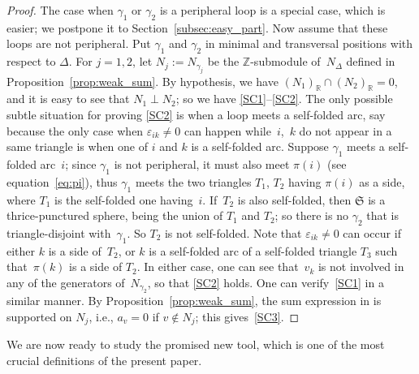 \documentclass[10pt,a4paper]{amsart}
\numberwithin{equation}{section}
\theoremstyle{definition}
\begin{document}
\begin{proof} The case when $\gamma_1$ or $\gamma_2$ is a peripheral loop is a special case, which is easier; we postpone it to Section~\ref{subsec:easy_part}. Now assume that these loops are not peripheral. Put $\gamma_1$ and $\gamma_2$ in minimal and transversal positions with respect to $\Delta$. For $j=1,2$, let $N_j := N_{\gamma_j}$ be the $\mathbb{Z}$-submodule of~$N_\Delta$ defined in Proposition~\ref{prop:weak_sum}. By hypothesis, we have $(N_1)_\mathbb{R} \cap (N_2)_\mathbb{R}=0$, and it is easy to see that $N_1 \perp N_2$; so we have \ref{SC1}--\ref{SC2}. The only possible subtle situation for proving \ref{SC2} is when a loop meets a self-folded arc, say because the only case when $\varepsilon_{ik} \neq 0$ can happen while~$i$,~$k$ do not appear in a same triangle is when one of $i$ and $k$ is a self-folded arc. Suppose $\gamma_1$ meets a self-folded arc~$i$; since $\gamma_1$ is not peripheral, it must also meet $\pi(i)$ (see equation~\eqref{eq:pi}), thus $\gamma_1$ meets the two triangles $T_1$, $T_2$ having $\pi(i)$ as a side, where $T_1$ is the self-folded one having~$i$. If~$T_2$ is also self-folded, then $\mathfrak{S}$ is a thrice-punctured sphere, being the union of $T_1$ and $T_2$; so there is no $\gamma_2$ that is triangle-disjoint with~$\gamma_1$. So $T_2$ is not self-folded. Note that $\varepsilon_{ik} \neq 0$ can occur if either $k$ is a side of~$T_2$, or $k$ is a self-folded arc of a self-folded triangle $T_3$ such that~$\pi(k)$ is a side of $T_2$. In either case, one can see that~$v_k$ is not involved in any of the generators of~$N_{\gamma_2}$, so that \ref{SC2} holds. One can verify~\ref{SC1} in a similar manner.
By Proposition~\ref{prop:weak_sum}, the sum expression in  is supported on $N_j$, i.e., $a_v =0$ if $v \notin N_j$; this gives~\ref{SC3}.
\end{proof}
We are now ready to study the promised new tool, which is one of the most crucial definitions of the present paper.
\end{document}
